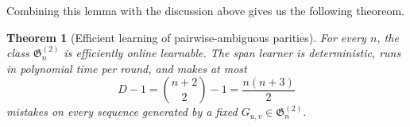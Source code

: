 \documentclass[11pt]{article}
\newtheorem{theorem}{Theorem}[section]
\theoremstyle{remark}
\begin{document}
Combining this lemma with the discussion above gives us the following theoreom.

\begin{theorem}[Efficient learning of pairwise-ambiguous parities]
For every $n$, the class $\mathfrak{G}_n^{(2)}$ is efficiently online learnable. The span learner is deterministic, runs in polynomial time per round, and makes at most
\[
    D-1=\binom{n+2}{2}-1=\frac{n(n+3)}{2}
\]
mistakes on every sequence generated by a fixed $G_{u,v}\in\mathfrak{G}_n^{(2)}$.
\end{theorem}




\end{document}

